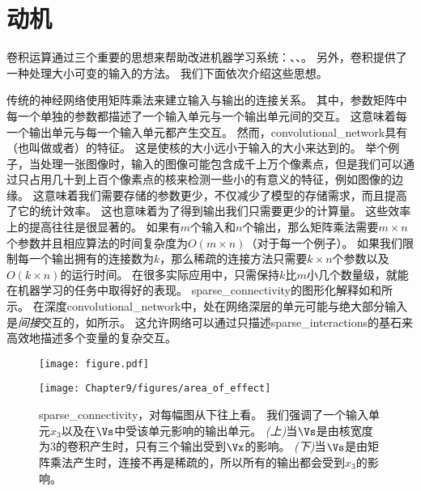 \section{动机}
\label{sec:motivation}

卷积运算通过三个重要的思想来帮助改进机器学习系统：、、。
另外，卷积提供了一种处理大小可变的输入的方法。
我们下面依次介绍这些思想。

传统的神经网络使用矩阵乘法来建立输入与输出的连接关系。%
其中，参数矩阵中每一个单独的参数都描述了一个输入单元与一个输出单元间的交互。
这意味着每一个输出单元与每一个输入单元都产生交互。
然而，\gls{convolutional_network}具有（也叫做或者）的特征。
这是使核的大小远小于输入的大小来达到的。
举个例子，当处理一张图像时，输入的图像可能包含成千上万个像素点，但是我们可以通过只占用几十到上百个像素点的核来检测一些小的有意义的特征，例如图像的边缘。
这意味着我们需要存储的参数更少，不仅减少了模型的存储需求，而且提高了它的统计效率。
这也意味着为了得到输出我们只需要更少的计算量。
这些效率上的提高往往是很显著的。
如果有$m$个输入和$n$个输出，那么矩阵乘法需要$m \times n$个参数并且相应算法的时间复杂度为$O(m\times n)$（对于每一个例子）。
如果我们限制每一个输出拥有的连接数为$k$，那么稀疏的连接方法只需要$k\times n$个参数以及$O(k\times n)$的运行时间。
在很多实际应用中，只需保持$k$比$m$小几个数量级，就能在机器学习的任务中取得好的表现。
\gls{sparse_connectivity}的图形化解释如和所示。
在深度\gls{convolutional_network}中，处在网络深层的单元可能与绝大部分输入是\emph{间接}交互的，如所示。
这允许网络可以通过只描述\gls{sparse_interactions}的基石来高效地描述多个变量的复杂交互。
\begin{figure}[!htb]
\ifOpenSource
\centerline{\texttt{[image: figure.pdf]}}
\else
\centerline{\texttt{[image: Chapter9/figures/area\_of\_effect]}}
\fi
\captionsetup{singlelinecheck=off}
\caption[Caption for LOF]{\gls{sparse_connectivity}，对每幅图从下往上看。
我们强调了一个输入单元$x_3$以及在$\Vs$中受该单元影响的输出单元。
\emph{(上)}当$\Vs$是由核宽度为3的卷积产生时，只有三个输出受到$\Vx$的影响\protect\footnotemark。
\emph{(下)}当$\Vs$是由矩阵乘法产生时，连接不再是稀疏的，所以所有的输出都会受到$x_3$的影响。}
\label{fig:chap9_area_of_effect}
\end{figure}

